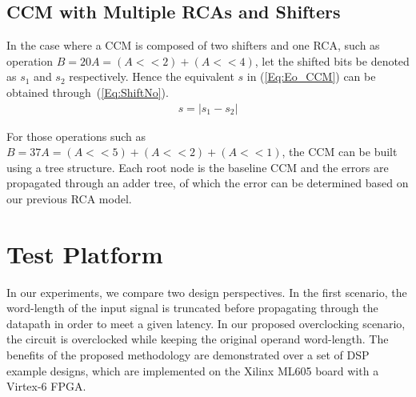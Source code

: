 \documentclass[prodmode,acmtrets]{acmsmall} %
\begin{document}
\subsection{CCM with Multiple RCAs and Shifters}\label{CCM_Multi}
In the case where a CCM is composed of two shifters and one RCA, such as operation $B=20A=(A<<2)+(A<<4)$, let the shifted bits be denoted as $s_1$ and $s_2$ respectively. Hence the equivalent $s$ in (\ref{Eq:Eo_CCM}) can be obtained through~(\ref{Eq:ShiftNo}).
%
\begin{eqnarray}\label{Eq:ShiftNo}
  s=\left|s_1-s_2\right|
\end{eqnarray}

For those operations such as $B=37A=(A<<5)+(A<<2)+(A<<1)$, the CCM can be built using a tree structure. Each root node is the baseline CCM and the errors are propagated through an adder tree, of which the error can be determined based on our previous RCA model.

\section{Test Platform}\label{Section_ExpSetup}
In our experiments, we compare two design perspectives. In the first scenario, the word-length of the input signal is truncated before propagating through the datapath in order to meet a given latency. In our proposed overclocking scenario, the circuit is overclocked while keeping the original operand word-length. The benefits of the proposed methodology are demonstrated over a set of DSP example designs, which are implemented on the Xilinx ML605 board with a Virtex-6 FPGA.
\end{document}
